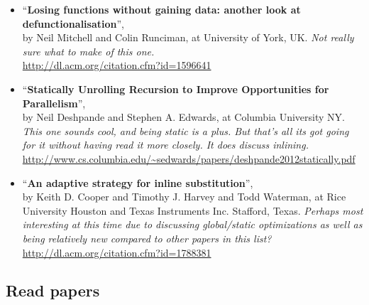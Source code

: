 \begin{itemize}
{written several relevant papers, and strict functional languages are some of
the more viable languages for this type of optimization...} \\
\url{http://citeseerx.ist.psu.edu/viewdoc/summary?doi=10.1.1.50.8424}
	\item ``\textbf{Losing functions without gaining data: another look at
defunctionalisation}'', \\ by Neil Mitchell and Colin Runciman, at University of
York, UK.
\textit{Not really sure what to make of this one.} \\
\url{http://dl.acm.org/citation.cfm?id=1596641}
	\item ``\textbf{Statically Unrolling Recursion to Improve Opportunities for
Parallelism}'', \\by Neil Deshpande and Stephen A. Edwards, at Columbia
University NY.
\textit{This one sounds cool, and being static is a plus. But that's all its got going for it without having read it more closely. It does discuss
inlining.}\\
\url{http://www.cs.columbia.edu/~sedwards/papers/deshpande2012statically.pdf}
	\item ``\textbf{An adaptive strategy for inline substitution}'', \\ by Keith
D. Cooper and Timothy J. Harvey and Todd Waterman, at Rice University Houston
and Texas Instruments Inc. Stafford, Texas.
\textit{Perhaps most interesting at this time due to discussing global/static
optimizations as well as being relatively new compared to other papers in this
list?}\\
\url{http://dl.acm.org/citation.cfm?id=1788381}
\end{itemize}

\subsection{Read papers}

